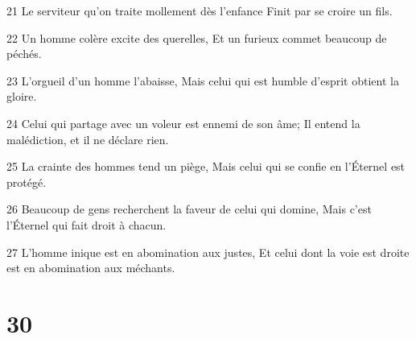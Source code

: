 \par 21 Le serviteur qu'on traite mollement dès l'enfance Finit par se croire un fils.
\par 22 Un homme colère excite des querelles, Et un furieux commet beaucoup de péchés.
\par 23 L'orgueil d'un homme l'abaisse, Mais celui qui est humble d'esprit obtient la gloire.
\par 24 Celui qui partage avec un voleur est ennemi de son âme; Il entend la malédiction, et il ne déclare rien.
\par 25 La crainte des hommes tend un piège, Mais celui qui se confie en l'Éternel est protégé.
\par 26 Beaucoup de gens recherchent la faveur de celui qui domine, Mais c'est l'Éternel qui fait droit à chacun.
\par 27 L'homme inique est en abomination aux justes, Et celui dont la voie est droite est en abomination aux méchants.

\chapter{30}

